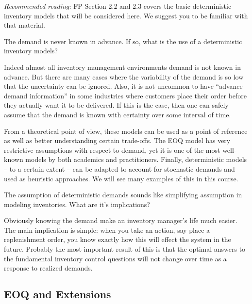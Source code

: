 \textit{Recommended reading:} FP Section 2.2 and 2.3 covers the basic deterministic inventory models that will be considered here. We suggest you to be familiar with that material. 


\begin{question}
The demand is never known in advance. If so, what is the use of a deterministic inventory models?
\end{question}

\begin{solution}
Indeed almost all inventory management environments demand is not known in advance. But there are many cases where the variability of the demand is so low that the uncertainty can be ignored. Also, it is not uncommon to have ``advance demand information'' in some industries where customers place their order before they actually want it to be delivered. If this is the case, then one can safely assume that the demand is known with certainty over some interval of time. 

From a theoretical point of view, these models can be used as a point of reference as well as better understanding certain trade-offs. The EOQ model has very restrictive assumptions with respect to demand, yet it is one of the most well-known models by both academics and practitioners. Finally, deterministic models -- to a certain extent -- can be adapted to account for stochastic demands and used as heuristic approaches. We will see many examples of this in this course.  
\end{solution}

\begin{question}
The assumption of deterministic demands sounds like simplifying assumption in modeling inventories. What are it's implications?
\end{question}

\begin{solution}
Obviously knowing the demand make an inventory manager's life much easier. The main implication is simple: when you take an action, say place a replenishment order, you know exactly how this will effect the system in the future. Probably the most important result of this is that the optimal answers to the fundamental inventory control questions will not change over time as a response to realized demands. 
\end{solution}

\subsection{EOQ and Extensions}

